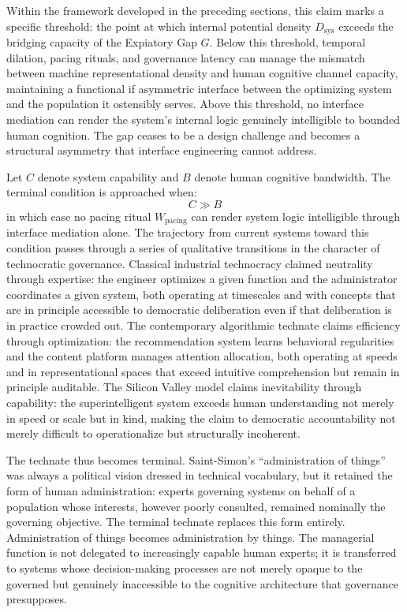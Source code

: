 \documentclass[12pt]{article}
\begin{document}
Within the framework developed in the preceding sections, this claim marks a specific threshold: the point at which internal potential density $D_{\text{sys}}$ exceeds the bridging capacity of the Expiatory Gap $G$. Below this threshold, temporal dilation, pacing rituals, and governance latency can manage the mismatch between machine representational density and human cognitive channel capacity, maintaining a functional if asymmetric interface between the optimizing system and the population it ostensibly serves. Above this threshold, no interface mediation can render the system's internal logic genuinely intelligible to bounded human cognition. The gap ceases to be a design challenge and becomes a structural asymmetry that interface engineering cannot address.

Let $C$ denote system capability and $B$ denote human cognitive bandwidth. The terminal condition is approached when:
\[
C \gg B
\]
in which case no pacing ritual $W_{\text{pacing}}$ can render system logic intelligible through interface mediation alone. The trajectory from current systems toward this condition passes through a series of qualitative transitions in the character of technocratic governance. Classical industrial technocracy claimed neutrality through expertise: the engineer optimizes a given function and the administrator coordinates a given system, both operating at timescales and with concepts that are in principle accessible to democratic deliberation even if that deliberation is in practice crowded out. The contemporary algorithmic technate claims efficiency through optimization: the recommendation system learns behavioral regularities and the content platform manages attention allocation, both operating at speeds and in representational spaces that exceed intuitive comprehension but remain in principle auditable. The Silicon Valley model claims inevitability through capability: the superintelligent system exceeds human understanding not merely in speed or scale but in kind, making the claim to democratic accountability not merely difficult to operationalize but structurally incoherent.

The technate thus becomes terminal. Saint-Simon's ``administration of things'' was always a political vision dressed in technical vocabulary, but it retained the form of human administration: experts governing systems on behalf of a population whose interests, however poorly consulted, remained nominally the governing objective. The terminal technate replaces this form entirely. Administration of things becomes administration by things. The managerial function is not delegated to increasingly capable human experts; it is transferred to systems whose decision-making processes are not merely opaque to the governed but genuinely inaccessible to the cognitive architecture that governance presupposes.
\end{document}
